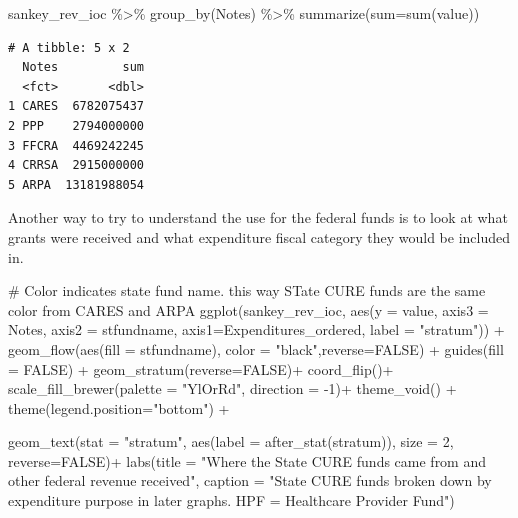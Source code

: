 \documentclass[
  letterpaper,
  DIV=11,
  numbers=noendperiod]{scrreport}
\newenvironment{Shaded}{\begin{snugshade}}{\end{snugshade}}
\newcommand{\AttributeTok}[1]{\textcolor[rgb]{0.40,0.45,0.13}{#1}}
\newcommand{\CommentTok}[1]{\textcolor[rgb]{0.37,0.37,0.37}{#1}}
\newcommand{\ConstantTok}[1]{\textcolor[rgb]{0.56,0.35,0.01}{#1}}
\newcommand{\DecValTok}[1]{\textcolor[rgb]{0.68,0.00,0.00}{#1}}
\newcommand{\FunctionTok}[1]{\textcolor[rgb]{0.28,0.35,0.67}{#1}}
\newcommand{\NormalTok}[1]{\textcolor[rgb]{0.00,0.23,0.31}{#1}}
\newcommand{\SpecialCharTok}[1]{\textcolor[rgb]{0.37,0.37,0.37}{#1}}
\newcommand{\StringTok}[1]{\textcolor[rgb]{0.13,0.47,0.30}{#1}}
\begin{document}
\begin{Shaded}
\begin{Highlighting}[]
\NormalTok{sankey\_rev\_ioc }\SpecialCharTok{\%\textgreater{}\%} \FunctionTok{group\_by}\NormalTok{(Notes) }\SpecialCharTok{\%\textgreater{}\%} 
  \FunctionTok{summarize}\NormalTok{(}\AttributeTok{sum=}\FunctionTok{sum}\NormalTok{(value))}
\end{Highlighting}
\end{Shaded}

\begin{verbatim}
# A tibble: 5 x 2
  Notes         sum
  <fct>       <dbl>
1 CARES  6782075437
2 PPP    2794000000
3 FFCRA  4469242245
4 CRRSA  2915000000
5 ARPA  13181988054
\end{verbatim}

Another way to try to understand the use for the federal funds is to
look at what grants were received and what expenditure fiscal category
they would be included in.

\begin{Shaded}
\begin{Highlighting}[]
\CommentTok{\# Color indicates state fund name. this way STate CURE funds are the same color from CARES and ARPA}
\FunctionTok{ggplot}\NormalTok{(sankey\_rev\_ioc, }
       \FunctionTok{aes}\NormalTok{(}\AttributeTok{y =}\NormalTok{ value, }\AttributeTok{axis3 =}\NormalTok{ Notes, }\AttributeTok{axis2 =}\NormalTok{ stfundname, }\AttributeTok{axis1=}\NormalTok{Expenditures\_ordered, }\AttributeTok{label =} \StringTok{"stratum"}\NormalTok{)) }\SpecialCharTok{+}
  \FunctionTok{geom\_flow}\NormalTok{(}\FunctionTok{aes}\NormalTok{(}\AttributeTok{fill =}\NormalTok{ stfundname), }\AttributeTok{color =} \StringTok{"black"}\NormalTok{,}\AttributeTok{reverse=}\ConstantTok{FALSE}\NormalTok{) }\SpecialCharTok{+}
  \FunctionTok{guides}\NormalTok{(}\AttributeTok{fill =} \ConstantTok{FALSE}\NormalTok{) }\SpecialCharTok{+}   
  \FunctionTok{geom\_stratum}\NormalTok{(}\AttributeTok{reverse=}\ConstantTok{FALSE}\NormalTok{)}\SpecialCharTok{+}
\FunctionTok{coord\_flip}\NormalTok{()}\SpecialCharTok{+}
   \FunctionTok{scale\_fill\_brewer}\NormalTok{(}\AttributeTok{palette =} \StringTok{"YlOrRd"}\NormalTok{, }\AttributeTok{direction =} \SpecialCharTok{{-}}\DecValTok{1}\NormalTok{)}\SpecialCharTok{+}
  \FunctionTok{theme\_void}\NormalTok{() }\SpecialCharTok{+}  
  \FunctionTok{theme}\NormalTok{(}\AttributeTok{legend.position=}\StringTok{"bottom"}\NormalTok{) }\SpecialCharTok{+}

  \FunctionTok{geom\_text}\NormalTok{(}\AttributeTok{stat =} \StringTok{"stratum"}\NormalTok{, }\FunctionTok{aes}\NormalTok{(}\AttributeTok{label =} \FunctionTok{after\_stat}\NormalTok{(stratum)), }\AttributeTok{size =} \DecValTok{2}\NormalTok{, }\AttributeTok{reverse=}\ConstantTok{FALSE}\NormalTok{)}\SpecialCharTok{+}
  \FunctionTok{labs}\NormalTok{(}\AttributeTok{title =} \StringTok{"Where the State CURE funds came from and other federal revenue received"}\NormalTok{,}
       \AttributeTok{caption =} \StringTok{"State CURE funds broken down by expenditure purpose in later graphs.}
\StringTok{       HPF = Healthcare Provider Fund"}\NormalTok{)}
\end{Highlighting}
\end{Shaded}
\end{document}
